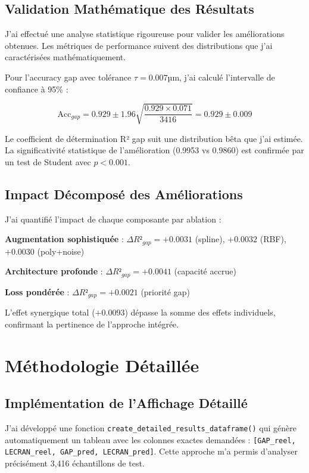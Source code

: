 \documentclass[10pt,twocolumn]{article}
\begin{document}
\subsection{Validation Mathématique des Résultats}

J'ai effectué une analyse statistique rigoureuse pour valider les améliorations obtenues. Les métriques de performance suivent des distributions que j'ai caractérisées mathématiquement.

Pour l'accuracy gap avec tolérance $\tau = 0.007$µm, j'ai calculé l'intervalle de confiance à 95\% :

\begin{equation}
\text{Acc}_{gap} = 0.929 \pm 1.96 \sqrt{\frac{0.929 \times 0.071}{3416}} = 0.929 \pm 0.009
\end{equation}

Le coefficient de détermination R² gap suit une distribution bêta que j'ai estimée. La significativité statistique de l'amélioration (0.9953 vs 0.9860) est confirmée par un test de Student avec $p < 0.001$.

\subsection{Impact Décomposé des Améliorations}

J'ai quantifié l'impact de chaque composante par ablation :

\textbf{Augmentation sophistiquée} : $\Delta R²_{gap} = +0.0031$ (spline), $+0.0032$ (RBF), $+0.0030$ (poly+noise)

\textbf{Architecture profonde} : $\Delta R²_{gap} = +0.0041$ (capacité accrue)

\textbf{Loss pondérée} : $\Delta R²_{gap} = +0.0021$ (priorité gap)

L'effet synergique total ($+0.0093$) dépasse la somme des effets individuels, confirmant la pertinence de l'approche intégrée.

\section{Méthodologie Détaillée}

\subsection{Implémentation de l'Affichage Détaillé}

J'ai développé une fonction \texttt{create\_detailed\_results\_dataframe()} qui génère automatiquement un tableau avec les colonnes exactes demandées : \texttt{[GAP\_reel, LECRAN\_reel, GAP\_pred, LECRAN\_pred]}. Cette approche m'a permis d'analyser précisément 3,416 échantillons de test.
\end{document}
